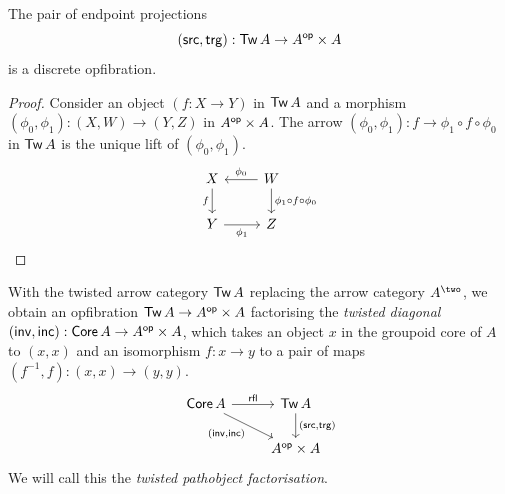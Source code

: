 \begin{proposition}\label{prop:src-trg-discrete-opfibration}
  The pair of endpoint projections
  \[(\mathop{\mathsf{src}},\mathop{\mathsf{trg}}) : \mathop{\mathsf{Tw}}{A} \to A^{\mathsf{op}} \times A\]
  is a discrete opfibration.
\end{proposition}
\begin{proof}
  Consider an object $(f : X \to Y)$ in $\mathop{\mathsf{Tw}}{A}$
  and a morphism $(\phi_0, \phi_1) : (X,W) \to (Y,Z)$ in $A^{\mathsf{op}} \times A$.
  The arrow
  $(\phi_0, \phi_1) : f \to \phi_1 \circ f \circ \phi_0$ in $\mathop{\mathsf{Tw}}{A}$
  is the unique lift of $(\phi_0, \phi_1)$.
  \[ \begin{tikzcd}
    X & W \\
    Y & Z
    \arrow[""{name=0, anchor=center, inner sep=0}, "f"', from=1-1, to=2-1]
    \arrow["{\phi_0}"', from=1-2, to=1-1]
    \arrow[""{name=1, anchor=center, inner sep=0}, "\phi_1 \circ f \circ \phi_0", from=1-2, to=2-2]
    \arrow["{\phi_1}"', from=2-1, to=2-2]
  \end{tikzcd}\]
\end{proof}

With the twisted arrow category $\mathop{\mathsf{Tw}}{A}$ replacing the arrow category $A^\two$,
we obtain an opfibration $\mathop{\mathsf{Tw}}{A} \to {A}^{\mathsf{op}} \times A$
factorising the \emph{twisted diagonal}
$(\mathop{\mathsf{inv}}, \mathop{\mathsf{inc}}) : \mathop{\mathsf{Core}} A \to {A}^{\mathsf{op}} \times A$,
which takes an object $x$ in the groupoid core of $A$ to
$(x,x)$ and an isomorphism $f : x \to y$
to a pair of maps $(f^{-1}, f) : (x,x) \to (y,y)$.
\[
\begin{tikzcd}
	{\Core A} & {\Tw{A}} \\
	& {{A}^\op \times A}
	\arrow["\rfl", from=1-1, to=1-2]
	\arrow["{(\inv,\inc)}"', from=1-1, to=2-2]
	\arrow["{{(\src,\trg)}}", from=1-2, to=2-2]
\end{tikzcd}
\]
We will call this the \emph{twisted pathobject factorisation}.




